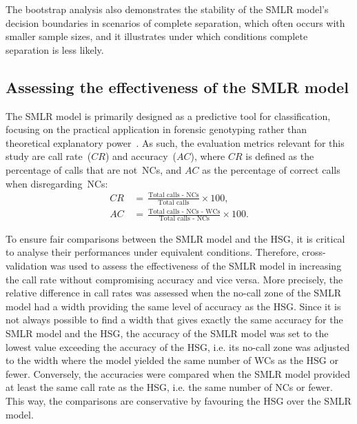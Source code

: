 \documentclass[preprint,5p,times,11pt]{elsarticle}
\begin{document}
The bootstrap analysis also demonstrates the stability of the SMLR model's decision boundaries in scenarios of complete separation, which often occurs with smaller sample sizes, and it illustrates under which conditions complete separation is less likely.


\subsection{Assessing the effectiveness of the SMLR model}
The SMLR model is primarily designed as a predictive tool for classification, focusing on the practical application in forensic genotyping rather than theoretical explanatory power~\cite{shmueli}.
As such, the evaluation metrics relevant for this study are call rate~($CR$) and accuracy~($AC$), where $CR$ is defined as the percentage of calls that are not~NCs, and $AC$ as the percentage of correct calls when disregarding~NCs:
\begin{align*}
CR \, &= \, \frac{\text{Total calls - NCs}}{\text{Total calls}} \times 100, \\
AC \, &= \, \frac{\text{Total calls - NCs - WCs}}{\text{Total calls - NCs}} \times 100.
\end{align*}

To ensure fair comparisons between the SMLR model and the HSG, it is critical to analyse their performances under equivalent conditions.
Therefore, cross-validation was used to assess the effectiveness of the SMLR model in increasing the call rate without compromising accuracy and vice versa.
More precisely, the relative difference in call rates was assessed when the no-call zone of the SMLR model had a width providing the same level of accuracy as the HSG.
Since it is not always possible to find a width that gives exactly the same accuracy for the SMLR model and the HSG, the accuracy of the SMLR model was set to the lowest value exceeding the accuracy of the HSG, i.e. its no-call zone was adjusted to the width where the model yielded the same number of WCs as the HSG or fewer.
Conversely, the accuracies were compared when the SMLR model provided at least the same call rate as the HSG, i.e. the same number of NCs or fewer.
This way, the comparisons are conservative by favouring the HSG over the SMLR model.
\end{document}
